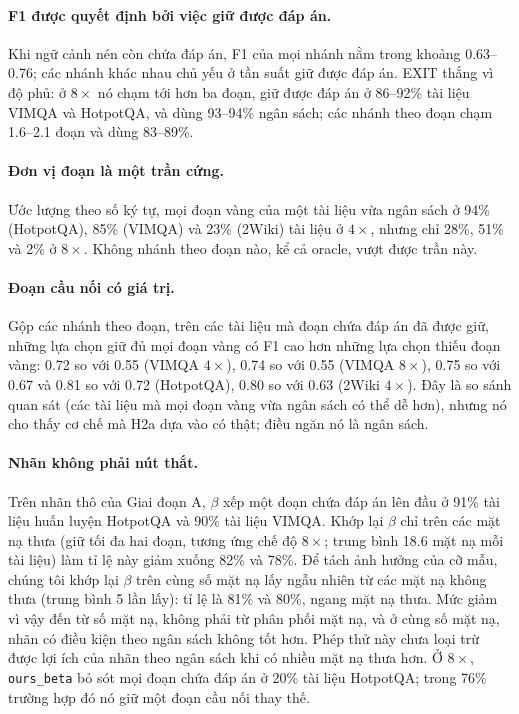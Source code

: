 \documentclass[11pt]{article}
\newcommand{\arm}[1]{\texttt{#1}}
\begin{document}
\paragraph{F1 được quyết định bởi việc giữ được đáp án.} Khi ngữ cảnh nén còn chứa đáp án, F1 của mọi nhánh
nằm trong khoảng 0.63--0.76; các nhánh khác nhau chủ yếu ở tần suất giữ được đáp án. EXIT thắng vì độ phủ: ở
$8\times$ nó chạm tới hơn ba đoạn, giữ được đáp án ở 86--92\% tài liệu VIMQA và HotpotQA, và dùng 93--94\% ngân
sách; các nhánh theo đoạn chạm 1.6--2.1 đoạn và dùng 83--89\%.

\paragraph{Đơn vị đoạn là một trần cứng.} Ước lượng theo số ký tự, mọi đoạn vàng của một tài liệu vừa ngân sách
ở 94\% (HotpotQA), 85\% (VIMQA) và 23\% (2Wiki) tài liệu ở $4\times$, nhưng chỉ 28\%, 51\% và 2\% ở $8\times$. Không
nhánh theo đoạn nào, kể cả oracle, vượt được trần này.

\paragraph{Đoạn cầu nối có giá trị.} Gộp các nhánh theo đoạn, trên các tài liệu mà đoạn chứa đáp án đã được giữ,
những lựa chọn giữ đủ mọi đoạn vàng có F1 cao hơn những lựa chọn thiếu đoạn vàng: 0.72 so với 0.55 (VIMQA
$4\times$), 0.74 so với 0.55 (VIMQA $8\times$), 0.75 so với 0.67 và 0.81 so với 0.72 (HotpotQA), 0.80 so với 0.63
(2Wiki $4\times$). Đây là so sánh quan sát (các tài liệu mà mọi đoạn vàng vừa ngân sách có thể dễ hơn), nhưng
nó cho thấy cơ chế mà H2a dựa vào có thật; điều ngăn nó là ngân sách.

\paragraph{Nhãn không phải nút thắt.} Trên nhãn thô của Giai đoạn A, $\beta$ xếp một đoạn chứa đáp án lên đầu ở
91\% tài liệu huấn luyện HotpotQA và 90\% tài liệu VIMQA. Khớp lại $\beta$ chỉ trên các mặt nạ thưa (giữ tối đa
hai đoạn, tương ứng chế độ $8\times$; trung bình 18.6 mặt nạ mỗi tài liệu) làm tỉ lệ này giảm xuống 82\% và 78\%. Để tách
ảnh hưởng của cỡ mẫu, chúng tôi khớp lại $\beta$ trên cùng số mặt nạ lấy ngẫu nhiên từ các mặt nạ không thưa (trung bình 5
lần lấy): tỉ lệ là 81\% và 80\%, ngang mặt nạ thưa. Mức giảm vì vậy đến từ số mặt nạ, không phải từ phân phối mặt nạ, và ở
cùng số mặt nạ, nhãn có điều kiện theo ngân sách không tốt hơn. Phép thử này chưa loại trừ được lợi ích của nhãn theo ngân
sách khi có nhiều mặt nạ thưa hơn. Ở $8\times$, \arm{ours\_beta} bỏ sót mọi
đoạn chứa đáp án ở 20\% tài liệu HotpotQA; trong 76\% trường hợp đó nó giữ một đoạn cầu nối thay thế.
\end{document}
